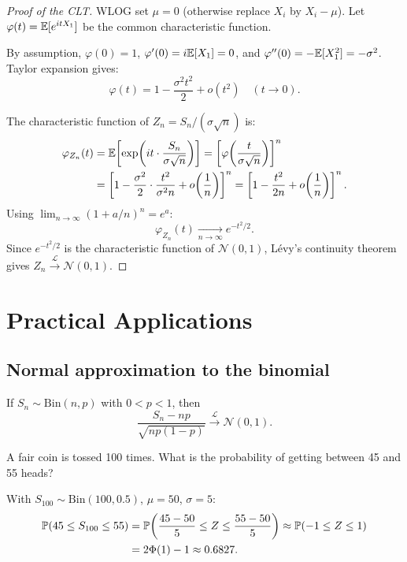 \begin{proof}[Proof of the CLT]
WLOG set $\mu = 0$ (otherwise replace $X_i$ by $X_i - \mu$). Let
$\varphi(t) = \mathbb{E}[e^{itX_1}]$ be the common characteristic function.

By assumption, $\varphi(0) = 1$, $\varphi'(0) = i\mathbb{E}[X_1] = 0$, and
$\varphi''(0) = -\mathbb{E}[X_1^2] = -\sigma^2$. Taylor expansion gives:
\[
    \varphi(t) = 1 - \frac{\sigma^2 t^2}{2} + o(t^2) \quad (t \to 0).
\]

The characteristic function of $Z_n = S_n/(\sigma\sqrt{n})$ is:
\begin{align*}
    \varphi_{Z_n}(t) &= \mathbb{E}\!\left[\exp\!\left(it\cdot\frac{S_n}{\sigma\sqrt{n}}\right)\right]
    = \left[\varphi\!\left(\frac{t}{\sigma\sqrt{n}}\right)\right]^n \\
    &= \left[1 - \frac{\sigma^2}{2}\cdot\frac{t^2}{\sigma^2 n}
       + o\!\left(\frac{1}{n}\right)\right]^n
    = \left[1 - \frac{t^2}{2n} + o\!\left(\frac{1}{n}\right)\right]^n.
\end{align*}
Using $\lim_{n\to\infty}(1 + a/n)^n = e^a$:
\[
    \varphi_{Z_n}(t) \xrightarrow[n\to\infty]{} e^{-t^2/2}.
\]
Since $e^{-t^2/2}$ is the characteristic function of $\mathcal{N}(0,1)$,
L\'evy's continuity theorem gives
$Z_n \xrightarrow{\mathcal{L}} \mathcal{N}(0,1)$.
\end{proof}

\section{Practical Applications}

\subsection{Normal approximation to the binomial}

\begin{corollary}
If $S_n \sim \mathrm{Bin}(n, p)$ with $0 < p < 1$, then
\[
    \frac{S_n - np}{\sqrt{np(1-p)}} \xrightarrow{\mathcal{L}} \mathcal{N}(0,1).
\]
\end{corollary}

\begin{example}
A fair coin is tossed 100 times. What is the probability of getting between 45
and 55 heads?

With $S_{100} \sim \mathrm{Bin}(100, 0.5)$, $\mu = 50$, $\sigma = 5$:
\begin{align*}
    \mathbb{P}(45 \leq S_{100} \leq 55)
    &= \mathbb{P}\!\left(\frac{45-50}{5} \leq Z \leq \frac{55-50}{5}\right)
    \approx \mathbb{P}(-1 \leq Z \leq 1) \\
    &= 2\Phi(1) - 1 \approx 0.6827.
\end{align*}
\end{example}

